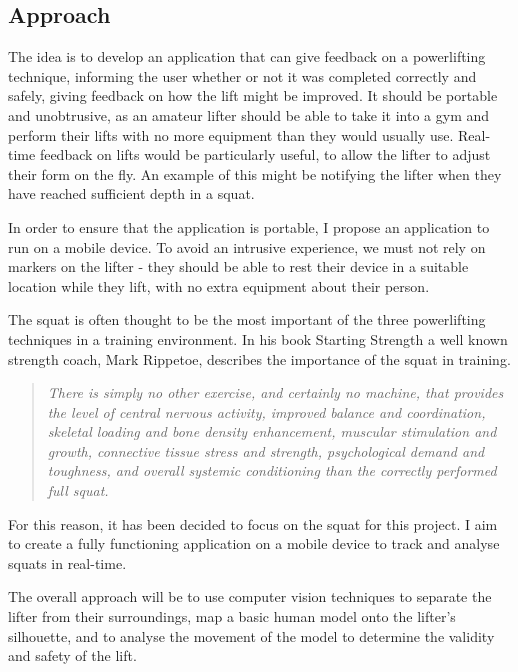 \subsection{Approach}

The idea is to develop an application that can give feedback on a powerlifting technique, informing the user whether or not it was completed correctly and safely, giving feedback on how the lift might be improved. It should be portable and unobtrusive, as an amateur lifter should be able to take it into a gym and perform their lifts with no more equipment than they would usually use. Real-time feedback on lifts would be particularly useful, to allow the lifter to adjust their form on the fly. An example of this might be notifying the lifter when they have reached sufficient depth in a squat.

In order to ensure that the application is portable, I propose an application to run on a mobile device. To avoid an intrusive experience, we must not rely on markers on the lifter - they should be able to rest their device in a suitable location while they lift, with no extra equipment about their person.

The squat is often thought to be the most important of the three powerlifting techniques in a training environment. In his book Starting Strength\cite{startingstrength} a well known strength coach, Mark Rippetoe, describes the importance of the squat in training.

\begin{quote}
\emph{There is simply no other exercise, and certainly no machine, that provides the level of central nervous activity, improved balance and coordination, skeletal loading and bone density enhancement, muscular stimulation and growth, connective tissue stress and strength, psychological demand and toughness, and overall systemic conditioning than the correctly performed full squat.}
\end{quote}

For this reason, it has been decided to focus on the squat for this project. I aim to create a fully functioning application on a mobile device to track and analyse squats in real-time.

The overall approach will be to use computer vision techniques to separate the lifter from their surroundings, map a basic human model onto the lifter's silhouette, and to analyse the movement of the model to determine the validity and safety of the lift.
